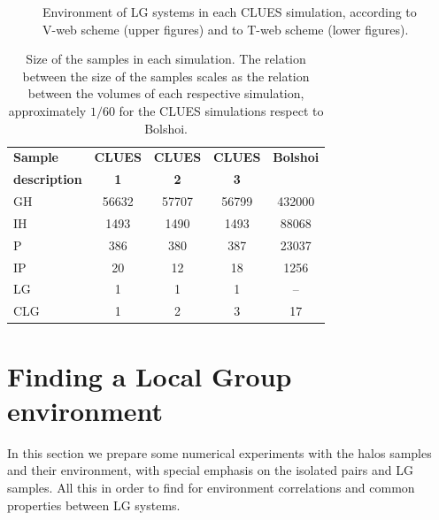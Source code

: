 \documentclass[usenatbib]{latex/mn2e}
\begin{document}
\begin{figure}
\begin{center}
\caption{\small Environment of LG systems in each CLUES simulation, 
according to V-web scheme (upper figures) and to T-web scheme (lower 
figures).}
\label{fig:LG_CLUES}
\vspace{0.1 cm}
\end{center}
\end{figure}

\begin{table}
  \centering
  \begin{tabular}{l | c c c c} \hline
	\textbf{Sample}& \textbf{CLUES} & \textbf{CLUES} & \textbf{CLUES} & \textbf{Bolshoi} \\
	\textbf{description}& \textbf{1} & \textbf{2} & \textbf{3} &  \\ \hline
	GH	&	56632	&	57707	&	56799	&	432000 	\\
	IH	&	1493	&	1490	&	1493	&	88068 	\\
	P	&	386 	&	380 	&	387		&	23037 	\\
	IP	&	20	 	&	12		&	18		&	1256 	\\
	LG	&	1 		&	1 		&	1		&	-- 		\\
	CLG &	1		&	2		&	3		&	17		\\ \hline
  \end{tabular}
  
  \caption{Size of the samples in each simulation. The relation between 
  the size of the samples scales as the relation between the volumes of 
  each respective simulation, approximately $1/60$ for the CLUES 
  simulations respect to Bolshoi.}
  
  \label{Tab:Samples}
\end{table}


\section{Finding a Local Group environment}
\label{sec:experiments}


In this section we prepare some numerical experiments with the halos 
samples and their environment, with special emphasis on the isolated pairs 
and LG samples. All this in order to find for environment correlations and 
common properties between LG systems.
\end{document}
